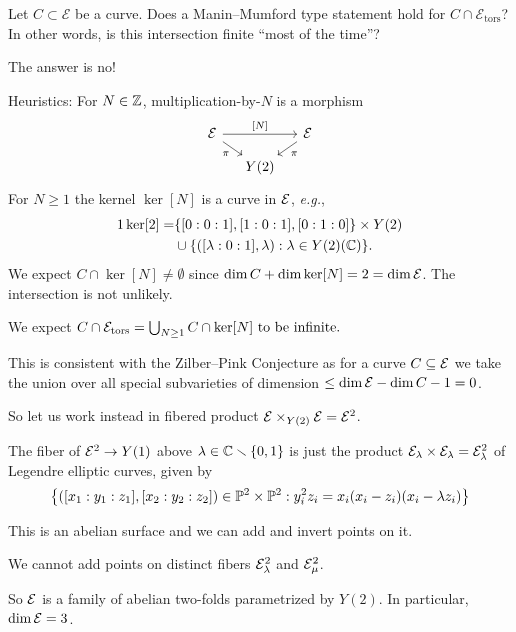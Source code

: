 \documentclass{beamer}
\begin{document}
\begin{frame}
  Let $C\subset \mathcal{E}$ be a curve. Does a
  Manin--Mumford type statement hold for $C\cap
  \mathcal{E}_{\mathrm{tors}}$? In other words, is this intersection
  finite ``most of the time''?

  The answer is \alert{no}! 

  Heuristics: For $N\in{\mathbb{Z}}$,  multiplication-by-$N$ is a
  morphism
  \begin{equation*}
    \begin{tikzcd}[ampersand replacement=\&,column sep=small, row sep=small] 
    \cE \arrow{dr}[swap]{\pi}  \arrow{rr}{[N]} \&  \& \cE\arrow{dl}{\pi}  \\
     \& Y(2)   
  \end{tikzcd}  
  \end{equation*}
  For $N\ge 1$ the kernel  $\ker[N]$ is a curve
  in ${\mathcal E}$, \textit{e.g.},
  \begin{alignat*}1
    \ker[2] = &\{[0:0:1],[1:0:1],[0:1:0]\}\times Y(2)\\
    &\cup
    \{([\lambda:0:1],\lambda) : \lambda \in Y(2)(\IC)\}.
  \end{alignat*}
  We expect $C\cap \ker[N]\not=\emptyset$
  since $\dim C + \dim \ker[N] = 2 = \dim {\mathcal E}$. The intersection is
  \alert{not} unlikely. 
  
  We expect $C\cap {\mathcal E}_{\mathrm{tors}} = \bigcup_{N\ge 1}C\cap \ker[N]
  \text{ to be infinite.}$
\end{frame}

\begin{frame}
  This is consistent with the Zilber--Pink Conjecture as for a curve
  $C\subseteq {\mathcal E}$ we take the union over all special subvarieties of
  dimension $\le \dim{\mathcal E}-\dim C - 1 = 0$. 

  So let us work instead in  \alert{fibered product}
  ${\mathcal E}\times_{Y(2)}{\mathcal E}={\mathcal E}^2$.

  \begin{example}
    The fiber of ${\mathcal E}^2\rightarrow Y(1)$ above  $\lambda\in
    {\mathbb{C}}\smallsetminus\{0,1\}$
    is just the product ${\mathcal E}_\lambda\times {\mathcal E}_\lambda={\mathcal E}^2_\lambda$ of Legendre
    elliptic curves, given by
    \begin{equation*}
      \bigl\{([x_1:y_1:z_1],[x_2:y_2:z_2]) \in{\mathbb{P}}^2\times{\mathbb{P}}^2 : y_i^2z_i =
      x_i(x_i-z_i)(x_i-\lambda z_i)\bigr\}      
    \end{equation*}

    This is an abelian surface and we can add and invert points on it.

    We \alert{cannot} add points on distinct fibers ${\mathcal E}^2_{\lambda}$
    and ${\mathcal E}^2_\mu$.

    So ${\mathcal E}$ is a family of abelian two-folds parametrized by $Y(2)$.
    In particular, $\dim {\mathcal E} = 3$. 
  \end{example}
\end{frame}
\end{document}
